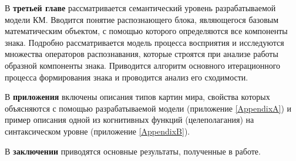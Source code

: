 В \textbf{третьей главе} рассматривается семантический уровень разрабатываемой модели КМ. Вводится понятие распознающего блока, являющегося базовым математическим объектом, с помощью которого определяются все компоненты знака. Подробно рассматривается модель процесса восприятия и исследуются множества операторов распознавания, которые строятся при анализе работы образной компоненты знака. Приводится алгоритм основного итерационного процесса формирования знака и проводится анализ его сходимости.

В \textbf{приложения} включены описания типов картин мира, свойства которых объясняются с помощью разрабатываемой модели (приложение \ref{AppendixA}) и пример описания одной из когнитивных функций (целеполагания) на синтаксическом уровне (приложение \ref{AppendixB}).

В \textbf{заключении} приводятся основные результаты, полученные в работе.
\clearpage
